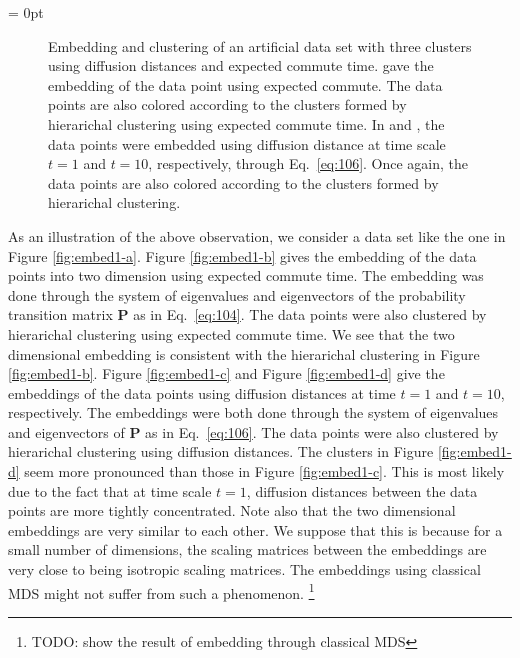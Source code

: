 \subfiglabelskip = 0pt
\begin{figure}[htbp]
  \centering
    \hspace{8pt}
        \caption{Embedding and clustering of an artificial data set
          with three clusters  using diffusion
          distances and expected commute time. 
          gave the embedding of the data point using expected
          commute. The data points are also colored according to the
          clusters formed by hierarichal clustering using expected
          commute time. In  and
          , the data points were embedded using
          diffusion distance at time scale $t = 1$ and $t = 10$,
          respectively, through Eq.~\eqref{eq:106}. Once again, the
          data points are also colored according to the clusters
          formed by hierarichal clustering.}
  \label{fig:embed1}
\end{figure}
As an illustration of the above observation, we consider a data set
like the one in Figure \ref{fig:embed1-a}. Figure \ref{fig:embed1-b}
gives the embedding of the data points into two dimension using
expected commute time. The embedding was done through the system of
eigenvalues and eigenvectors of the probability transition matrix
$\mathbf{P}$ as in Eq.~\eqref{eq:104}. The data points were also
clustered by hierarichal clustering using expected commute time. We
see that the two dimensional embedding is consistent with the
hierarichal clustering in Figure \ref{fig:embed1-b}. Figure
\ref{fig:embed1-c} and Figure \ref{fig:embed1-d} give the embeddings of
the data points using diffusion distances at time $t = 1$ and $t =
10$, respectively. The embeddings were both done through the system of
eigenvalues and eigenvectors of $\mathbf{P}$ as in
Eq.~\eqref{eq:106}. The data points were also clustered by hierarichal
clustering using diffusion distances. The clusters in Figure
\ref{fig:embed1-d} seem more pronounced than those in Figure
\ref{fig:embed1-c}. This is most likely due to the fact that at time
scale $t = 1$, diffusion distances between the data points are more
tightly concentrated. Note also that the two dimensional embeddings
are very similar to each other. We suppose that this is because for a
small number of dimensions, the scaling matrices between the
embeddings are very close to being isotropic scaling matrices. The
embeddings using classical MDS might not suffer from such a
phenomenon. \footnote{TODO: show the result of embedding through classical MDS} 
